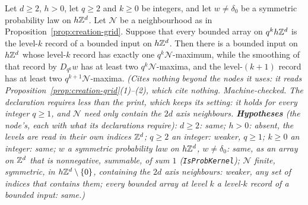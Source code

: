 \begin{lemma}
\label{lem:records-creation}
\leanok
{}
Let $d \ge 2$, $h > 0$, let $q \ge 2$ and $k \ge 0$ be integers, and let $w \ne \delta_0$ be a
symmetric probability law on $h\mathbb{Z}^d$. Let $\mathcal{N}$ be a
neighbourhood as in Proposition~\ref{prop:creation-grid}. Suppose that every bounded array on
$q^kh\mathbb{Z}^d$ is the level-$k$ record of a bounded input on $h\mathbb{Z}^d$. Then there is a bounded input on
$h\mathbb{Z}^d$ whose level-$k$ record has exactly one $q^k\mathcal{N}$-maximum, while the smoothing of that
record by $D_{q^k}w$ has at least two $q^k\mathcal{N}$-maxima, and the level-$(k+1)$ record has at
least two $q^{k+1}\mathcal{N}$-maxima.
\statusT\quad\emph{(Cites nothing beyond the nodes it uses: it reads
Proposition~\ref{prop:creation-grid}(1)--(2), which cite nothing. Machine-checked. The declaration
requires less than the print, which keeps its setting: it holds for every integer $q \ge 1$, and
$\mathcal{N}$ need only contain the $2d$ axis neighbours.
\textbf{Hypotheses} (the node's, each with what its declarations require): $d \ge 2$: same; $h > 0$:
absent, the levels are read in their own indices $\mathbb{Z}^d$; $q \ge 2$ an integer: weaker, $q \ge 1$;
$k \ge 0$ an integer: same; $w$ a symmetric probability law on $h\mathbb{Z}^d$, $w \ne \delta_0$: same, as
an array on $\mathbb{Z}^d$ that is nonnegative, summable, of sum $1$ (\texttt{IsProbKernel}); $\mathcal{N}$
finite, symmetric, in $h\mathbb{Z}^d \setminus \{0\}$, containing the $2d$ axis neighbours: weaker, any set
of indices that contains them; every bounded array at level $k$ a level-$k$ record of a bounded
input: same.)}
\end{lemma}

